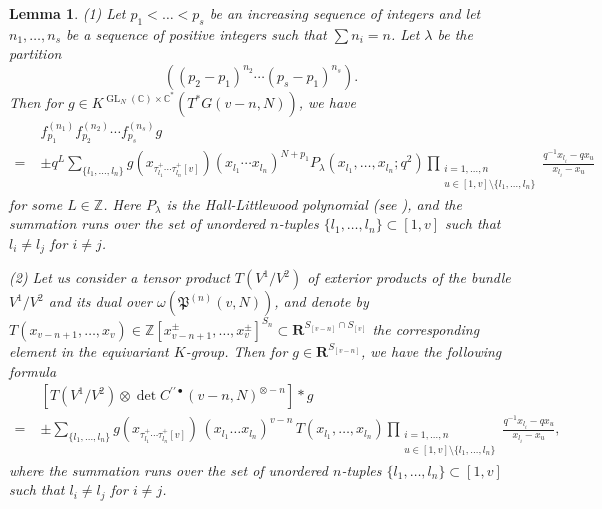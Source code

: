 \documentclass[12pt]{amsart}
\def\Bbb{\mathbb}
\def\frak{\mathfrak}
\newcommand{\rom}{\textup}
\newtheorem{Lemma}[equation]{Lemma}
\theoremstyle{definition}
\theoremstyle{remark}
\numberwithin{equation}{subsection}
\newcommand{\C}{{\Bbb C}}
\newcommand{\Z}{{\Bbb Z}}
\newcommand{\GL}{\operatorname{GL}}
\newcommand{\Pa}{{\frak P}} %
\begin{document}
\begin{Lemma}\label{lem:rank1_Grass}
\rom{(1)} Let $p_1 < \dots < p_s$ be an increasing sequence of integers
and let $n_1, \dots, n_s$ be a sequence of positive integers such that
$\sum n_i = n$.
Let $\lambda$ be the partition 
\[
   \left((p_2-p_1)^{n_2} \cdots (p_s-p_1)^{n_s}\right).
\]
Then for $g \in K^{\GL_N(\C)\times\C^*}(T^*G(v-n,N))$, we have
\begin{equation*}
\begin{split}
  & f_{p_1}^{(n_1)} f_{p_2}^{(n_2)} \cdots f_{p_s}^{(n_s)} g \\
  =\; & \pm q^L 
   \sum_{\{l_1,\dots,l_n\}}
    g(x_{\tau_{l_1}^+\cdots\tau_{l_n}^+[v]})
      {(x_{l_1}\cdots x_{l_n})}^{N+p_1}
      P_\lambda(x_{l_1},\dots, x_{l_n};q^2)
      \prod_{\substack{i=1,\dots, n\\
                      u\in [1,v]\setminus \{l_1,\dots, l_n\}}}
       \frac{q^{-1} x_{l_i} - q x_u}{x_{l_i} - x_u}
\end{split}
\end{equation*}
for some $L\in\Z$. 
%
Here $P_\lambda$ is the Hall-Littlewood polynomial \rom(see
\cite[III(2.1)]{Mac}\rom), and the summation runs over the set of
unordered $n$-tuples $\{ l_1,\dots,l_n\} \subset [1,v]$ such that
$l_i\neq l_j$ for $i\neq j$.

\rom{(2)} Let us consider a tensor product $T(V^1/V^2)$ of exterior
products of the bundle $V^1/V^2$ and its dual over
$\omega(\Pa^{(n)}(v,N))$, and denote by 
\(
   T(x_{v-n+1}, \dots, x_v) \in 
   \Z[x_{v-n+1}^{\pm},\dots, x_v^\pm]^{S_n}\subset 
   \mathbf R^{S_{[v-n]}\cap S_{[v]}}
\)
the corresponding element in the equivariant $K$-group.
Then for $g\in \mathbf R^{S_{[v-n]}}$, we have the following formula
\begin{equation*}
\begin{split}
    & \left[T(V^1/V^2)\otimes
        \det C^{\prime\prime\bullet}(v-n,N)^{\otimes-n}\right] \ast g \\
    =\; & 
    \pm \sum_{\{l_1,\dots,l_n\}}
    g(x_{\tau_{l_1}^+\cdots\tau_{l_n}^+[v]})\,
    (x_{l_1}\dots x_{l_n})^{v-n}\,
     T(x_{l_1}, \dots, x_{l_n})
      \prod_{\substack{i=1,\dots, n\\
                      u\in [1,v]\setminus \{l_1,\dots, l_n\}}}
        \frac{q^{-1} x_{l_i} - q x_u}{x_{l_i} - x_u},
\end{split}
\end{equation*}
where the summation runs over the set of unordered $n$-tuples $\{
l_1,\dots,l_n\} \subset [1,v]$ such that $l_i\neq l_j$ for $i\neq j$.
\end{Lemma}
\end{document}
